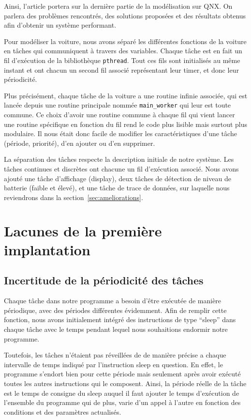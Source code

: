 \documentclass[conference]{IEEEtran}
\begin{document}
Ainsi, l'article portera sur la dernière partie de la modé\-lisation sur QNX. On parlera des problèmes rencontrés, des solutions proposées et des résultats obtenus afin d'obtenir un système performant.

Pour modéliser la voiture, nous avons séparé les diffé\-rentes fonctions de la voiture en tâches qui communiquent à travers des variables. Chaque tâche est en fait un fil d'exécution de la bibliothèque \texttt{pthread}. Tout ces fils sont initialisés au même instant et ont chacun un second fil associé représentant leur timer, et donc leur périodicité.

Plus précisément, chaque tâche de la voiture a une routine infinie associée, qui est lancée depuis une routine principale nommée \texttt{main\_worker} qui leur est toute commune. Ce choix d'avoir une routine commune à chaque fil qui vient lancer une routine spécifique en fonction du fil rend le code plus lisible mais surtout plus modulaire. Il nous était donc facile de modifier les caractéristiques d'une tâche (période, priorité), d'en ajouter ou d'en supprimer.

La séparation des tâches respecte la description initiale de notre système. Les tâches continues et discrètes ont chacune un fil d'exécution associé. Nous avons ajouté une tâche d'affichage (display), deux tâches de détection de niveau de batterie (faible et élevé), et une tâche de trace de données, sur laquelle nous reviendrons dans la section~\ref{sec:ameliorations}.



\section{Lacunes de la première implantation}

\subsection{Incertitude de la périodicité des tâches}

Chaque tâche dans notre programme a besoin d'être exécutée de manière périodique, avec des périodes différentes évidemment. Afin de remplir cette fonction, nous avons initialement intégré des instructions de type \enquote{sleep} dans chaque tâche avec le temps pendant lequel nous souhaitions endormir notre programme.

Toutefois, les tâches n'étaient pas réveillées de de manière précise a chaque intervalle de temps indiqué par l'instruction sleep en question. En effet, le programme s'endort bien pour cette période mais seulement après avoir exécuté toutes les autres instructions qui le composent. Ainsi, la période réelle de la tâche est le temps de consigne du sleep auquel il faut ajouter le temps d'exécution de l'ensemble du programme qui de plus, varie d'un appel à l'autre en fonction des conditions et des paramètres actualisés.
\end{document}
